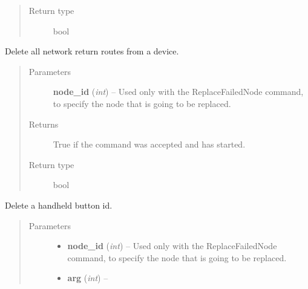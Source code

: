 \documentclass[letterpaper,10pt,english]{sphinxmanual}
\begin{document}
\begin{fulllineitems}
\begin{fulllineitems}
\begin{quote}
\begin{description}
\item[{Return type}] \leavevmode
bool

\end{description}\end{quote}

\end{fulllineitems}


\begin{fulllineitems}
\label{controller:openzwave.controller.ZWaveController.begin_command_delete_all_return_routes}
Delete all network return routes from a device.
\begin{quote}\begin{description}
\item[{Parameters}] \leavevmode
\textbf{node\_id} (\emph{int}) -- Used only with the ReplaceFailedNode command, to specify the node that is going to be replaced.

\item[{Returns}] \leavevmode
True if the command was accepted and has started.

\item[{Return type}] \leavevmode
bool

\end{description}\end{quote}

\end{fulllineitems}


\begin{fulllineitems}
\label{controller:openzwave.controller.ZWaveController.begin_command_delete_button}
Delete a handheld button id.
\begin{quote}\begin{description}
\item[{Parameters}] \leavevmode\begin{itemize}
\item {} 
\textbf{node\_id} (\emph{int}) -- Used only with the ReplaceFailedNode command, to specify the node that is going to be replaced.

\item {} 
\textbf{arg} (\emph{int}) -- 


\end{itemize}
\end{description}
\end{quote}
\end{fulllineitems}
\end{fulllineitems}
\end{document}
